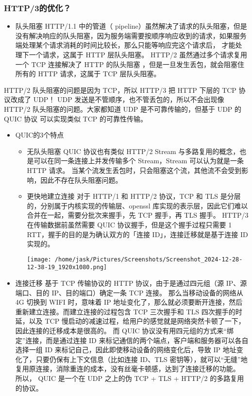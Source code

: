 \documentclass[11pt]{article}
\begin{document}
\subsubsection{HTTP/3的优化？}
\label{sec:orgd8cc54d}
\begin{itemize}
\item 队头阻塞
HTTP/1.1 中的管道（ pipeline）虽然解决了请求的队头阻塞，但是没有解决响应的队头阻塞，因为服务端需要按顺序响应收到的请求，如果服务端处理某个请求消耗的时间比较长，那么只能等响应完这个请求后， 才能处理下一个请求，这属于 HTTP 层队头阻塞。
HTTP/2 虽然通过多个请求复用一个 TCP 连接解决了 HTTP 的队头阻塞 ，但是一旦发生丢包，就会阻塞住所有的 HTTP 请求，这属于 TCP 层队头阻塞。
\end{itemize}
HTTP/2 队头阻塞的问题是因为 TCP，所以 HTTP/3 把 HTTP 下层的 TCP 协议改成了 UDP！
UDP 发送是不管顺序，也不管丢包的，所以不会出现像 HTTP/2 队头阻塞的问题。大家都知道 UDP 是不可靠传输的，但基于 UDP 的 QUIC 协议 可以实现类似 TCP 的可靠性传输。
\begin{itemize}
\item QUIC的3个特点
\begin{itemize}
\item 无队头阻塞
QUIC 协议也有类似 HTTP/2 Stream 与多路复用的概念，也是可以在同一条连接上并发传输多个 Stream，Stream 可以认为就是一条 HTTP 请求。
当某个流发生丢包时，只会阻塞这个流，其他流不会受到影响，因此不存在队头阻塞问题。
\item 更快地建立连接
对于 HTTP/1 和 HTTP/2 协议，TCP 和 TLS 是分层的，分别属于内核实现的传输层、openssl 库实现的表示层，因此它们难以合并在一起，需要分批次来握手，先 TCP 握手，再 TLS 握手。
HTTP/3 在传输数据前虽然需要 QUIC 协议握手，但是这个握手过程只需要 1 RTT，握手的目的是为确认双方的「连接 ID」，连接迁移就是基于连接 ID 实现的。
\begin{center}
\texttt{[image: /home/jask/Pictures/Screenshots/Screenshot\_2024-12-28-12-38-19\_1920x1080.png]}
\end{center}
\end{itemize}
\item 连接迁移
基于 TCP 传输协议的 HTTP 协议，由于是通过四元组（源 IP、源端口、目的 IP、目的端口）确定一条 TCP 连接。
那么当移动设备的网络从 4G 切换到 WIFI 时，意味着 IP 地址变化了，那么就必须要断开连接，然后重新建立连接。而建立连接的过程包含 TCP 三次握手和 TLS 四次握手的时延，以及 TCP 慢启动的减速过程，给用户的感觉就是网络突然卡顿了一下，因此连接的迁移成本是很高的。
而 QUIC 协议没有用四元组的方式来“绑定”连接，而是通过连接 ID 来标记通信的两个端点，客户端和服务器可以各自选择一组 ID 来标记自己，因此即使移动设备的网络变化后，导致 IP 地址变化了，只要仍保有上下文信息（比如连接 ID、TLS 密钥等），就可以“无缝”地复用原连接，消除重连的成本，没有丝毫卡顿感，达到了连接迁移的功能。
所以， QUIC 是一个在 UDP 之上的伪 TCP + TLS + HTTP/2 的多路复用的协议。
\end{itemize}
\end{document}
